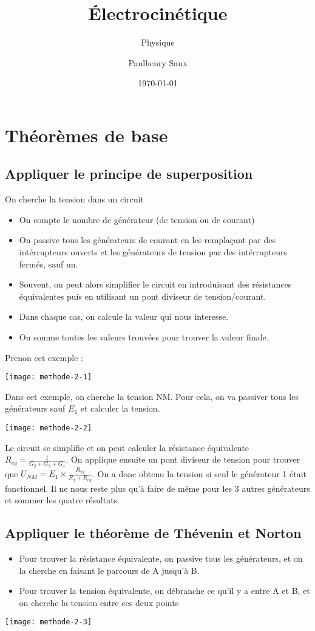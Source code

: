 \documentclass[french]{yLectureNote}
\title{Électrocinétique}
\subtitle{Physique}
\author{Paulhenry Saux}
\date{\today}
\begin{document}
	\chapter{Théorèmes de base}
\section{Appliquer le principe de superposition}
On cherche la tension dans un circuit
\begin{itemize}
 \item On compte le nombre de générateur (de tension ou de courant)
 \item On passive tous les générateurs de courant en les remplaçant par des intérrupteurs ouverts et les générateurs de tension par des intérrupteurs fermés, sauf un.
 \item Souvent, on peut alors simplifier le circuit en introduisant des résistances équivalentes puis en utilisant un pont diviseur de tension/courant.
 \item Dans chaque cas, on calcule la valeur qui nous interesse.
 \item On somme toutes les valeurs trouvées pour trouver la valeur finale.
\end{itemize}
Prenon cet exemple :

\texttt{[image: methode-2-1]}

Dans cet exemple, on cherche la tension NM. Pour cela, on va passiver tous les générateurs sauf \(E_1\) et calculer la tension.

\texttt{[image: methode-2-2]}

Le circuit se simplifie et on peut calculer la résistance équivalente \(R_{eq} = \frac{1}{G_2+G_3+G_4}\). On applique ensuite un pont diviseur de tension pour trouver que \(U_{NM} = E_1 \times \frac{R_{eq}}{R_1+R_{eq}}\). On a donc obtenu la tension si seul le générateur 1 était fonctionnel. Il ne nous reste plus qu'à faire de m\^eme pour les 3 autres générateurs et sommer les quatre résultats.

\section{Appliquer le théorème de Thévenin et Norton}
\begin{itemize}
 \item Pour trouver la résistance équivalente, on passive tous les générateurs, et on la cherche en faisant le parcours de A jusqu'à B.
 \item Pour trouver la tension équivalente, on débranche ce qu'il y a entre A et B, et on cherche la tension entre ces deux points
\end{itemize}
\texttt{[image: methode-2-3]}
\end{document}
